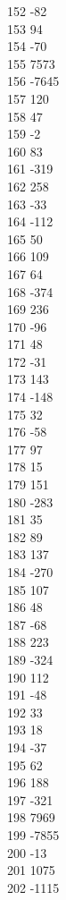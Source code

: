 { 152	-82 \\
 153	94 \\
 154	-70 \\
 155	7573 \\
 156	-7645 \\
 157	120 \\
 158	47 \\
 159	-2 \\
 160	83 \\
 161	-319 \\
 162	258 \\
 163	-33 \\
 164	-112 \\
 165	50 \\
 166	109 \\
 167	64 \\
 168	-374 \\
 169	236 \\
 170	-96 \\
 171	48 \\
 172	-31 \\
 173	143 \\
 174	-148 \\
 175	32 \\
 176	-58 \\
 177	97 \\
 178	15 \\
 179	151 \\
 180	-283 \\
 181	35 \\
 182	89 \\
 183	137 \\
 184	-270 \\
 185	107 \\
 186	48 \\
 187	-68 \\
 188	223 \\
 189	-324 \\
 190	112 \\
 191	-48 \\
 192	33 \\
 193	18 \\
 194	-37 \\
 195	62 \\
 196	188 \\
 197	-321 \\
 198	7969 \\
 199	-7855 \\
 200	-13 \\
 201	1075 \\
 202	-1115 \\
}
